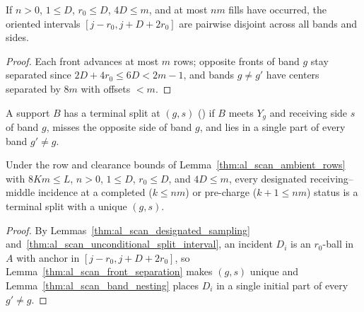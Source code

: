\begin{lemma}
    \label{thm:al_scan_front_separation}
    \leanok
    If $n>0$, $1\le D$, $r_0\le D$, $4D\le m$, and at most $nm$ fills have
    occurred, the oriented intervals $[j-r_0,j+D+2r_0]$ are pairwise disjoint
    across all bands and sides.
\end{lemma}
\begin{proof}\leanok
    Each front advances at most $m$ rows; opposite fronts of band $g$ stay
    separated since $2D+4r_0\le6D<2m-1$, and bands $g\ne g'$ have centers
    separated by $8m$ with offsets $<m$.
\end{proof}

\begin{definition}
    \label{def:al_scan_terminal_split}
    \leanok
    A support $B$ has a terminal split at $(g,s)$ (\cite[Section~7]{OpenAI2026AreaLaw})
    if $B$ meets $Y_g$ and receiving side $s$ of band $g$, misses the opposite
    side of band $g$, and lies in a single part of every band $g'\ne g$.
\end{definition}

\begin{lemma}
    \label{thm:al_scan_terminal_split}
    \leanok
    Under the row and clearance bounds of Lemma~\ref{thm:al_scan_ambient_rows}
    with $8Km\le L$, $n>0$, $1\le D$, $r_0\le D$, and $4D\le m$, every
    designated receiving--middle incidence at a completed ($k\le nm$) or
    pre-charge ($k+1\le nm$) status is a terminal split with a unique $(g,s)$.
\end{lemma}
\begin{proof}\leanok
    By Lemmas~\ref{thm:al_scan_designated_sampling}
    and~\ref{thm:al_scan_unconditional_split_interval}, an incident $D_i$ is an
    $r_0$-ball in $A$ with anchor in $[j-r_0,j+D+2r_0]$, so
    Lemma~\ref{thm:al_scan_front_separation} makes $(g,s)$ unique and
    Lemma~\ref{thm:al_scan_band_nesting} places $D_i$ in a single initial
    part of every $g'\ne g$.
\end{proof}

